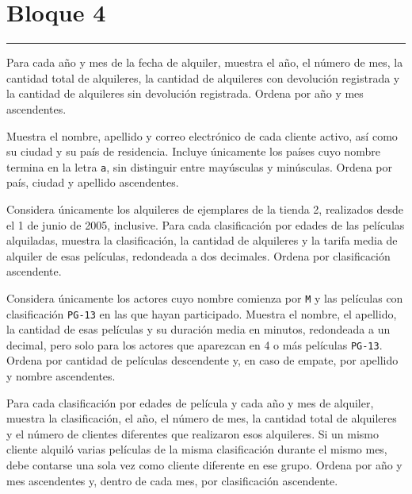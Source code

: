\documentclass[11pt,a4paper]{article}
\begin{document}
\section*{Bloque 4}\vspace{-3mm}\color{LBcereza}\rule{\textwidth}{0.5pt}\color{LBtexto}
\par{}\par\smallskip Para cada año y mes de la fecha de alquiler, muestra el año, el número de mes, la cantidad total de alquileres, la cantidad de alquileres con devolución registrada y la cantidad de alquileres sin devolución registrada. Ordena por año y mes ascendentes.\par\medskip
{}\par{}\par\smallskip Muestra el nombre, apellido y correo electrónico de cada cliente activo, así como su ciudad y su país de residencia. Incluye únicamente los países cuyo nombre termina en la letra \texttt{a}, sin distinguir entre mayúsculas y minúsculas. Ordena por país, ciudad y apellido ascendentes.\par\medskip
{}\par{}\par\smallskip Considera únicamente los alquileres de ejemplares de la tienda 2, realizados desde el 1 de junio de 2005, inclusive. Para cada clasificación por edades de las películas alquiladas, muestra la clasificación, la cantidad de alquileres y la tarifa media de alquiler de esas películas, redondeada a dos decimales. Ordena por clasificación ascendente.\par\medskip
{}\par{}\par\smallskip Considera únicamente los actores cuyo nombre comienza por \texttt{M} y las películas con clasificación \texttt{PG-13} en las que hayan participado. Muestra el nombre, el apellido, la cantidad de esas películas y su duración media en minutos, redondeada a un decimal, pero solo para los actores que aparezcan en 4 o más películas \texttt{PG-13}. Ordena por cantidad de películas descendente y, en caso de empate, por apellido y nombre ascendentes.\par\medskip
{}\par{}\par\smallskip Para cada clasificación por edades de película y cada año y mes de alquiler, muestra la clasificación, el año, el número de mes, la cantidad total de alquileres y el número de clientes diferentes que realizaron esos alquileres. Si un mismo cliente alquiló varias películas de la misma clasificación durante el mismo mes, debe contarse una sola vez como cliente diferente en ese grupo. Ordena por año y mes ascendentes y, dentro de cada mes, por clasificación ascendente.\par\medskip
\end{document}
